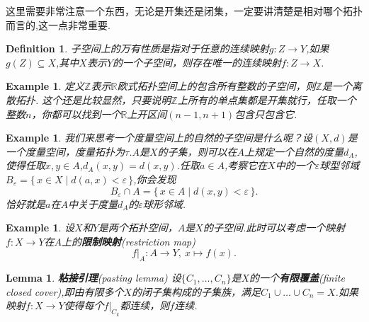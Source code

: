 \documentclass{article}
\newtheorem{lemma}[theorem]{Lemma}
\newtheorem{example}[theorem]{Example}
\newtheorem{definition}[theorem]{Definition}
\newcommand*{\xfunc}[4]{{#2}\colon{#3}{#1}{#4}}
\newcommand*{\func}[3]{\xfunc{\to}{#1}{#2}{#3}}
\newcommand\Set[2]{\{\,#1\mid#2\,\}} %
\begin{document}
这里需要非常注意一个东西，无论是开集还是闭集，一定要讲清楚是相对哪个拓扑而言的,这一点非常重要.

\begin{definition}
子空间上的万有性质是指对于任意的连续映射$\func{g}{Z}{Y}$,如果$g(Z) \subseteq X$,其中$X$表示$Y$的一个子空间，则存在唯一的连续映射$\func{f}{Z}{X}$.

\begin{center}
\end{center}
\end{definition}


\begin{example}
定义$\mathbb{Z}$表示$\mathbb{R}$欧式拓扑空间上的包含所有整数的子空间，则$\mathbb{Z}$是一个离散拓扑. 这个还是比较显然，只要说明$\mathbb{Z}$上所有的单点集都是开集就行，任取一个整数$n$，你都可以找到一个$\mathbb{R}$上开区间$(n-1,n+1)$包含只包含它.
\end{example}


\begin{example}
我们来思考一个度量空间上的自然的子空间是什么呢？设$(X,d)$是一个度量空间，度量拓扑为$\tau$.$A$是$X$的子集，则可以在$A$上规定一个自然的度量$d_A$,使得任取$x,y \in A$,$d_A(x,y)=d(x,y)$.任取$a \in A$,考察它在$X$中的一个$\varepsilon$球型邻域$B_\varepsilon=\Set{x \in X}{d(a,x) < \varepsilon}$,你会发现\[B_\varepsilon \cap A = \Set{x \in A}{d(x,y) < \varepsilon}.\]恰好就是$a$在$A$中关于度量$d_A$的$\varepsilon$球形邻域.	
\end{example}


\begin{example}
设$X$和$Y$是两个拓扑空间，$A$是$X$的子空间.此时可以考虑一个映射$\func{f}{X}{Y}$在$A$上的\textbf{限制映射}(restriction map)\[\func{f|_A}{A}{Y},\ x \mapsto f(x).\]
\end{example}

\begin{lemma}
\textbf{粘接引理}(pasting lemma) 设$\{C_1,\ldots,C_n\}$是$X$的一个\textbf{有限覆盖}(finite closed cover),即由有限多个$X$的闭子集构成的子集族，满足$C_1 \cup \ldots \cup C_n=X$.如果映射$\func{f}{X}{Y}$使得每个$f|_{C_k}$都连续，则$f$连续.
\end{lemma}
\end{document}
